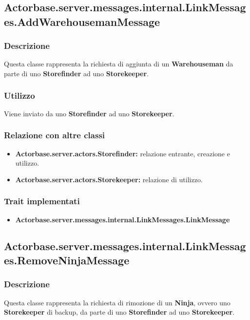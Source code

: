 \documentclass[a4paper]{article}
\begin{document}
		\subsection{Actorbase.server.messages.internal.LinkMessages.AddWarehousemanMessage}
			\subsubsection{Descrizione}
				Questa classe rappresenta la richiesta di aggiunta di un \textbf{Warehouseman} da parte di uno \textbf{Storefinder} 
				ad uno \textbf{Storekeeper}.
				
			\subsubsection{Utilizzo}
				Viene inviato da uno \textbf{Storefinder} ad uno \textbf{Storekeeper}.
				
			\subsubsection{Relazione con altre classi}
				\begin{itemize}
					\item \textbf{Actorbase.server.actors.Storefinder:} relazione entrante, creazione e utilizzo.
					\item \textbf{Actorbase.server.actors.Storekeeper:} relazione di utilizzo.
				\end{itemize}
				
			\subsubsection{Trait implementati}
				\begin{itemize}
					\item \textbf{Actorbase.server.messages.internal.LinkMessages.LinkMessage} 
				\end{itemize}
				
		\subsection{Actorbase.server.messages.internal.LinkMessages.RemoveNinjaMessage}
			\subsubsection{Descrizione}
				Questa classe rappresenta la richiesta di rimozione di un \textbf{Ninja}, ovvero uno \textbf{Storekeeper} di backup, da 
				parte di uno \textbf{Storefinder} ad uno \textbf{Storekeeper}.
				
\end{document}
